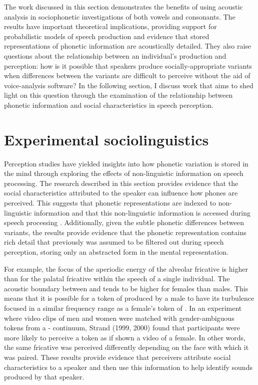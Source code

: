 The work discussed in this section demonstrates the benefits of using acoustic analysis in sociophonetic investigations of both vowels and consonants.  The results have important theoretical implications, providing support for probabilistic models of speech production and evidence that stored representations of phonetic information are acoustically detailed.  They also raise questions about the relationship between an individual's production and perception: how is it possible that speakers produce socially-appropriate variants when differences between the variants are difficult to perceive without the aid of voice-analysis software?  In the following section, I discuss work that aims to shed light on this question through the examination of the relationship between phonetic information and social characteristics in speech perception.


\section{Experimental sociolinguistics}\label{sec:perception}
Perception studies have yielded insights into how phonetic variation is stored in the mind through exploring the effects of non-lin\-guis\-tic information on speech processing.  The research described in this section provides evidence that the social characteristics attributed to the speaker can influence how phones are perceived.  This suggests that phonetic representations are indexed to non-lin\-guis\-tic information and that this non-lin\-guis\-tic information is accessed during speech pro\-cessing \cite{strand1999,campbellkibler2007,dragerunderrev}.  Additionally, given the subtle phonetic differences between variants, the results provide evidence that the phonetic representation contains rich detail that previously was assumed to be filtered out during speech perception, storing only an abstracted form in the mental representation.

For example, the focus of the aperiodic energy of the alveolar fricative  is higher than for the palatal fricative  within the speech of a single individual.  The acoustic boundary between  and  tends to be higher for females than males.  This means that it is possible for a token of  produced by a male to have its turbulence focused in a similar frequency range as a female's token of .  In an experiment where video clips of men and women were matched with gender-ambiguous tokens from a  -  continuum,  Strand (1999, 2000) found that participants were more likely to perceive a token as  if shown a video of a female.  In other words, the same fricative was perceived differently depending on the face with which it was paired.  These results provide evidence that perceivers attribute social characteristics to a speaker and then use this information to help identify sounds produced by that speaker.

